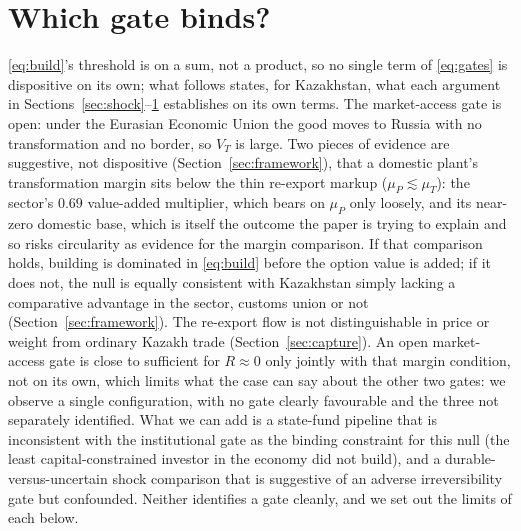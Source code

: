 \documentclass[12pt]{article}
\begin{document}
\section{Which gate binds?}\label{sec:why}

\eqref{eq:build}'s threshold is on a sum, not a product, so no single term of \eqref{eq:gates}
is dispositive on its own; what follows states, for Kazakhstan, what each argument in
Sections~\ref{sec:shock}--\ref{sec:why} establishes on its own terms. The market-access gate
is open: under the Eurasian Economic Union the good moves to Russia with no transformation and
no border, so $V_T$ is large. Two pieces of evidence are suggestive, not dispositive
(Section~\ref{sec:framework}), that a domestic plant's transformation margin sits below the
thin re-export markup ($\mu_P \lesssim \mu_T$): the sector's $0.69$ value-added multiplier,
which bears on $\mu_P$ only loosely, and its near-zero domestic base, which is itself the
outcome the paper is trying to explain and so risks circularity as evidence for the margin
comparison. If that comparison holds, building is dominated in \eqref{eq:build} before the
option value is added; if it does not, the null is equally consistent with Kazakhstan simply
lacking a comparative advantage in the sector, customs union or not
(Section~\ref{sec:framework}). The re-export flow is not distinguishable in price or weight
from ordinary Kazakh trade (Section~\ref{sec:capture}). An open market-access gate is close to
sufficient for $R \approx 0$ only jointly with that margin condition, not on its own, which
limits what the case can say about the other two gates: we observe a single configuration,
with no gate clearly favourable and the three not separately identified. What we can add is a
state-fund pipeline that is inconsistent with the institutional gate as the binding constraint
for this null (the least
capital-constrained investor in the economy did not build), and a
durable-versus-uncertain shock comparison that is suggestive of an adverse
irreversibility gate but confounded. Neither identifies a gate cleanly, and we set out the
limits of each below.
\end{document}
